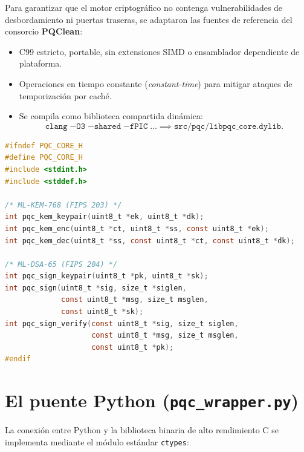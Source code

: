 \documentclass[11pt,a4paper,twoside,openright]{book}
\theoremstyle{plain}
\theoremstyle{definition}
\theoremstyle{remark}
\begin{document}
Para garantizar que el motor criptogr\'afico no contenga vulnerabilidades de desbordamiento ni puertas traseras, se adaptaron las fuentes de referencia del consorcio \textbf{PQClean}:
\begin{itemize}
  \item C99 estricto, portable, sin extensiones SIMD o ensamblador dependiente de plataforma.
  \item Operaciones en tiempo constante (\emph{constant-time}) para mitigar ataques de temporizaci\'on por cach\'e.
  \item Se compila como biblioteca compartida din\'amica:
  \[
    \mathtt{clang} \; \mathtt{-O3} \; \mathtt{-shared} \; \mathtt{-fPIC} \; \dots \implies \mathtt{src/pqc/libpqc\_core.dylib}.
  \]
\end{itemize}

\begin{conexioncodigo}
\begin{lstlisting}[language=C]
#ifndef PQC_CORE_H
#define PQC_CORE_H
#include <stdint.h>
#include <stddef.h>

/* ML-KEM-768 (FIPS 203) */
int pqc_kem_keypair(uint8_t *ek, uint8_t *dk);
int pqc_kem_enc(uint8_t *ct, uint8_t *ss, const uint8_t *ek);
int pqc_kem_dec(uint8_t *ss, const uint8_t *ct, const uint8_t *dk);

/* ML-DSA-65 (FIPS 204) */
int pqc_sign_keypair(uint8_t *pk, uint8_t *sk);
int pqc_sign(uint8_t *sig, size_t *siglen,
             const uint8_t *msg, size_t msglen,
             const uint8_t *sk);
int pqc_sign_verify(const uint8_t *sig, size_t siglen,
                    const uint8_t *msg, size_t msglen,
                    const uint8_t *pk);
#endif
\end{lstlisting}
\end{conexioncodigo}

\section{El puente Python (\texttt{pqc\_wrapper.py})}

La conexi\'on entre Python y la biblioteca binaria de alto rendimiento C se implementa mediante el m\'odulo est\'andar \texttt{ctypes}:
\end{document}
